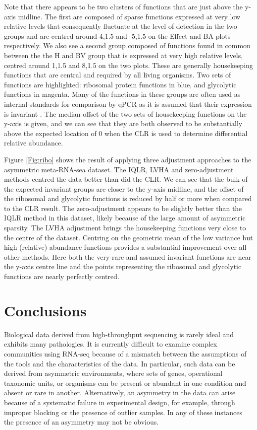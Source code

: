 \documentclass{bmcart}
\begin{document}
Note that there appears to be two clusters of functions that are just above the y-axis midline. The first are composed of sparse functions expressed at very low relative levels that consequently fluctuate at the level of detection in the two groups and are centred around 4,1.5 and -5,1.5 on the Effect and BA plots respectively.  We also see a second group composed of functions found in common between the the H and BV group that is  expressed at very high relative levels, centred around 1,1.5 and 8,1.5 on the two plots. These are generally housekeeping functions that are central and required by all living organisms. Two sets of functions are highlighted: ribosomal protein functions in blue, and glycolytic functions in magenta. Many of the functions in these groups are often used as internal standards for comparison by qPCR as it is assumed that their expression is invariant \cite{Scott:2010}. The median offset of the two sets of housekeeping functions  on the y-axis is given, and we can see that they are both observed to be substantially above the expected location of 0 when the CLR is used to determine differential relative abundance.   


Figure \ref{Fig:ribo} shows the result of applying  three adjustment approaches to the asymmetric meta-RNA-sea dataset. The IQLR, LVHA and zero-adjustment methods centred the data  better than did the CLR. We can see that the bulk of the expected invariant groups are closer to the y-axis midline, and the offset of the ribosomal and glycolytic functions is reduced by half or more when compared to the CLR result. The zero-adjustment  appears to be slightly better than the IQLR method in this dataset, likely because of the large amount of asymmetric sparsity. The LVHA adjustment brings the housekeeping functions very close to the centre of the dataset.  Centring on the geometric mean of the low variance but high (relative) abundance functions provides a substantial improvement over all other methods. Here both the very rare and assumed invariant functions are near the y-axis centre line and the points representing the ribosomal and glycolytic functions are nearly perfectly centred.

\section*{Conclusions}


Biological data derived from high-throughput sequencing is rarely ideal and exhibits many pathologies. It is currently difficult to examine complex communities using RNA-seq because of a mismatch between the assumptions of the tools and the characteristics of the data. In particular, such data can be derived from asymmetric environments, where sets of genes, operational taxonomic units, or organisms can be present or abundant in one condition and absent or rare in another. Alternatively, an asymmetry in the data can arise because of a systematic failure in experimental design, for example, through improper blocking or the presence of outlier samples. In any of these instances the presence of an asymmetry may not be obvious. 
\end{document}
